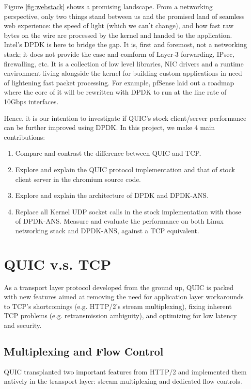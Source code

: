 \documentclass{sig-alternate-05-2015}
\begin{document}
Figure \ref{fig:webstack} shows a promising landscape. From a networking perspective, only two things stand between us and the promised land of seamless web experience: the speed of light (which we can't change), and how fast raw bytes on the wire are processed by the kernel and handed to the application. Intel's DPDK is here to bridge the gap. It is, first and foremost, not a networking stack; it does not provide the ease and comform of Layer-3 forwarding, IPsec, firewalling, etc. It is a collection of low level libraries, NIC drivers and a runtime environment living alongside the kernel for building custom applications in need of lightening fast packet processing.\cite{dpdk:home} For example, pfSense laid out a roadmap where the core of it will be rewritten with DPDK to run at the line rate of 10Gbps interfaces. \cite{pfsense:roadmap}

Hence, it is our intention to investigate if QUIC's stock client/server performance can be further improved using DPDK. In this project, we make 4 main contributions:

\begin{enumerate}
	\itemsep0em
	\item Compare and contrast the difference between QUIC and TCP.
	\item Explore and explain the QUIC protocol implementation and that of stock client server in the chromium source code.
	\item Explore and explain the architecture of DPDK and DPDK-ANS.
	\item Replace all Kernel UDP socket calls in the stock implementation with those of DPDK-ANS. Measure and evaluate the performance on both Linux networking stack and DPDK-ANS, against a TCP equivalent.
\end{enumerate}

\section{QUIC v.s. TCP}
As a transport layer protocol developed from the ground up, QUIC is packed with new features aimed at removing the need for application layer workarounds to TCP's shortcomings (e.g. HTTP/2's stream multiplexing), fixing inherent TCP problems (e.g. retransmission ambiguity), and optimizing for low latency and security.

\subsection{Multiplexing and Flow Control}
QUIC transplanted two important features from HTTP/2 and implemented them natively in the transport layer: stream multiplexing and dedicated flow controls.
\end{document}
